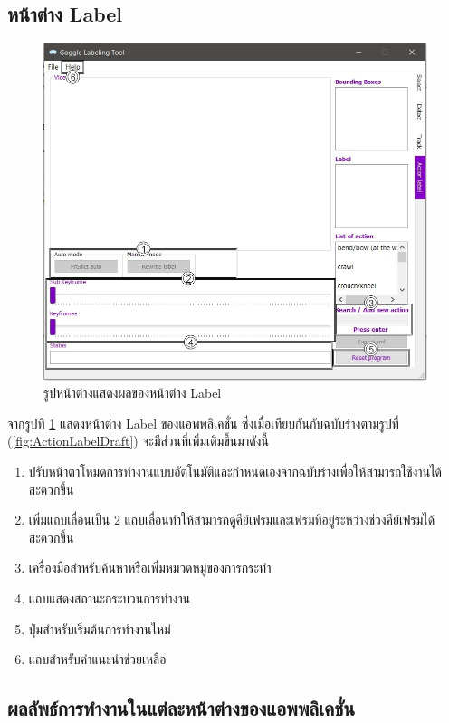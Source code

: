 \subsection*{หน้าต่าง Label}
\begin{figure}[!ht]
  \centering
    \includegraphics[scale=0.4]{chapter4/images/Final_ui/Label.jpg}
    \caption{รูปหน้าต่างแสดงผลของหน้าต่าง Label}
    \label{fig:final_label}
\end{figure}
จากรูปที่ \ref{fig:final_label} แสดงหน้าต่าง Label ของแอพพลิเคชั่น ซึ่งเมื่อเทียบกันกับฉบับร่างตามรูปที่ (\ref{fig:ActionLabelDraft}) จะมีส่วนที่เพิ่มเติมขึ้นมาดังนี้
\begin{enumerate}
	\item ปรับหน้าตาโหมดการทำงานแบบอัตโนมัติและกำหนดเองจากฉบับร่างเพื่อให้สามารถใช้งานได้สะดวกขึ้น
	\item เพิ่มแถบเลื่อนเป็น 2 แถบเลื่อนทำให้สามารถดูคีย์เฟรมและเฟรมที่อยู่ระหว่างช่วงคีย์เฟรมได้สะดวกขึ้น
	\item เครื่องมือสำหรับค้นหาหรือเพิ่มหมวดหมู่ของการกระทำ
	\item แถบแสดงสถานะกระบวนการทำงาน
	\item ปุ่มสำหรับเริ่มต้นการทำงานใหม่ 
	\item แถบสำหรับคำแนะนำช่วยเหลือ
\end{enumerate}		

\clearpage
\subsection{ผลลัพธ์การทำงานในแต่ละหน้าต่างของแอพพลิเคชั่น}

